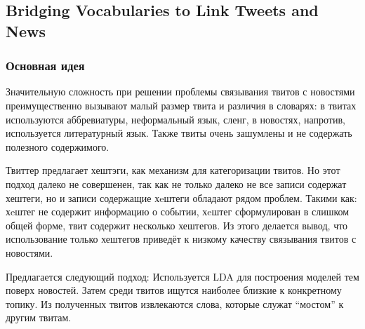 \documentclass[14pt,a4paper,oneside]{extarticle}
\begin{document}
    \subsection{Bridging Vocabularies to Link Tweets and News}
        \subsubsection{Основная идея}
            Значительную сложность при решении проблемы связывания твитов с новостями преимущественно вызывают малый размер твита и различия в словарях: в твитах используются аббревиатуры, неформальный язык, сленг, в новостях, напротив, используется литературный язык. Также твиты очень зашумлены и не содержать полезного содержимого.

            Твиттер предлагает хештэги, как механизм для категоризации твитов. Но этот подход далеко не совершенен, так как не только далеко не все записи содержат хештеги, но и записи содержащие хeштеги обладают рядом проблем. Такими как: хeштег не содержит информацию о событии, хeштег сформулирован в слишком общей форме, твит содержит несколько хештегов. Из этого делается вывод, что использование только хештегов приведёт к низкому качеству связывания твитов с новостями.

            Предлагается следующий подход:
            Используется LDA для построения моделей тем поверх новостей. Затем среди твитов ищутся наиболее близкие к конкретному топику. Из полученных твитов извлекаются слова, которые служат ``мостом'' к другим твитам.


    
\end{document}
